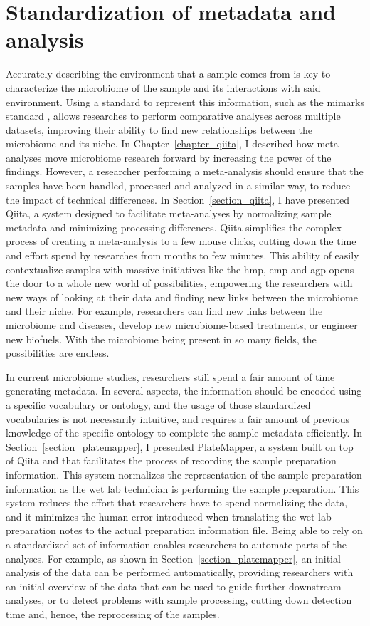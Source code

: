 \section{Standardization of metadata and analysis}

Accurately describing the environment that a sample comes from is key to characterize
the microbiome of the sample and its interactions with said environment. Using a
standard to represent this information, such as the \gls{mimarks} standard \cite{Yilmaz2011},
allows researches to perform comparative analyses across multiple datasets,
improving their ability to find new relationships between the microbiome and its
niche. In Chapter~\ref{chapter_qiita}, I described how meta-analyses move microbiome
research forward by increasing the power of the findings. However, a researcher
performing a meta-analysis should ensure that the samples have been handled,
processed and analyzed in a similar way, to reduce the impact of technical
differences. In Section~\ref{section_qiita}, I have presented Qiita, a system
designed to facilitate meta-analyses by normalizing sample metadata and minimizing
processing differences. Qiita simplifies the complex process of creating a
meta-analysis to a few mouse clicks, cutting down the time and effort spend by
researches from months to few minutes. This ability of easily contextualize samples
with massive initiatives like the \gls{hmp}, \gls{emp} and \gls{agp} opens the door
to a whole new world of possibilities, empowering the researchers with new ways of
looking at their data and finding new links between the microbiome and their niche.
For example, researchers can find new links between the microbiome and diseases,
develop new microbiome-based treatments, or engineer new biofuels. With the microbiome
being present in so many fields, the possibilities are endless.

In current microbiome studies, researchers still spend a fair amount of time generating
metadata. In several aspects, the information should be encoded using a specific
vocabulary or ontology, and the usage of those standardized vocabularies is not
necessarily intuitive, and requires a fair amount of previous knowledge of the
specific ontology to complete the sample metadata efficiently. In Section~\ref{section_platemapper},
I presented PlateMapper, a system built on top of Qiita and that facilitates the
process of recording the sample preparation information. This system normalizes
the representation of the sample preparation information as the wet lab technician
is performing the sample preparation. This system reduces the effort that researchers
have to spend normalizing the data, and it minimizes the human error introduced when
translating the wet lab preparation notes to the actual preparation information
file. Being able to rely on a standardized set of information enables researchers
to automate parts of the analyses. For example, as shown in Section~\ref{section_platemapper},
an initial analysis of the data can be performed automatically, providing
researchers with an initial overview of the data that can be used to guide further
downstream analyses, or to detect problems with sample processing, cutting down
detection time and, hence, the reprocessing of the samples.


